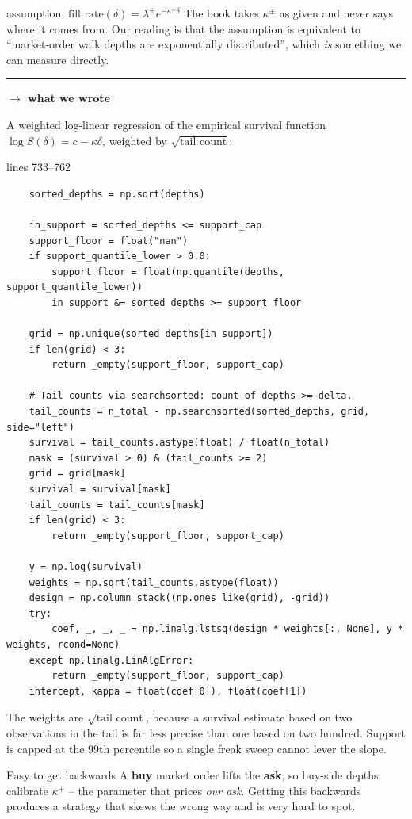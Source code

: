 \documentclass[11pt,a4paper]{article}
\newcommand{\wecode}{\par\vspace{4pt}\noindent
  \textcolor{NavyLink}{\rule{\linewidth}{0.4pt}}\par\vspace{3pt}
  \noindent\textbf{\textcolor{NavyLink}{$\rightarrow$ what we wrote}}\par\vspace{2pt}}
\newcommand{\snip}[3]{%
  \par\addvspace{6pt}\noindent
  {\footnotesize\color{NavyLink}\texttt{\detokenize{#1}}\quad lines #2--#3}%
  \par\nobreak\vspace{1pt}}
\begin{document}
\begin{booktocode}{assumption: $\text{fill rate}(\delta) = \lambda^{\pm}e^{-\kappa^{\pm}\delta}$}
The book takes $\kappa^{\pm}$ as given and never says where it comes from. Our
reading is that the assumption is equivalent to ``market-order walk depths are
exponentially distributed'', which \emph{is} something we can measure directly.
\wecode
A weighted log-linear regression of the empirical survival function
$\log S(\delta) = c - \kappa\delta$, weighted by $\sqrt{\text{tail count}}$:
\end{booktocode}

\snip{scripts/estimator_common.py}{733}{762}
\begin{lstlisting}
    sorted_depths = np.sort(depths)

    in_support = sorted_depths <= support_cap
    support_floor = float("nan")
    if support_quantile_lower > 0.0:
        support_floor = float(np.quantile(depths, support_quantile_lower))
        in_support &= sorted_depths >= support_floor

    grid = np.unique(sorted_depths[in_support])
    if len(grid) < 3:
        return _empty(support_floor, support_cap)

    # Tail counts via searchsorted: count of depths >= delta.
    tail_counts = n_total - np.searchsorted(sorted_depths, grid, side="left")
    survival = tail_counts.astype(float) / float(n_total)
    mask = (survival > 0) & (tail_counts >= 2)
    grid = grid[mask]
    survival = survival[mask]
    tail_counts = tail_counts[mask]
    if len(grid) < 3:
        return _empty(support_floor, support_cap)

    y = np.log(survival)
    weights = np.sqrt(tail_counts.astype(float))
    design = np.column_stack((np.ones_like(grid), -grid))
    try:
        coef, _, _, _ = np.linalg.lstsq(design * weights[:, None], y * weights, rcond=None)
    except np.linalg.LinAlgError:
        return _empty(support_floor, support_cap)
    intercept, kappa = float(coef[0]), float(coef[1])
\end{lstlisting}

The weights are $\sqrt{\text{tail count}}$, because a survival estimate based on
two observations in the tail is far less precise than one based on two hundred.
Support is capped at the 99th percentile so a single freak sweep cannot lever the
slope.

\begin{trap}{Easy to get backwards}
A \textbf{buy} market order lifts the \textbf{ask}, so buy-side depths calibrate
$\kappa^{+}$ -- the parameter that prices \emph{our ask}. Getting this backwards
produces a strategy that skews the wrong way and is very hard to spot.
\end{trap}
\end{document}
